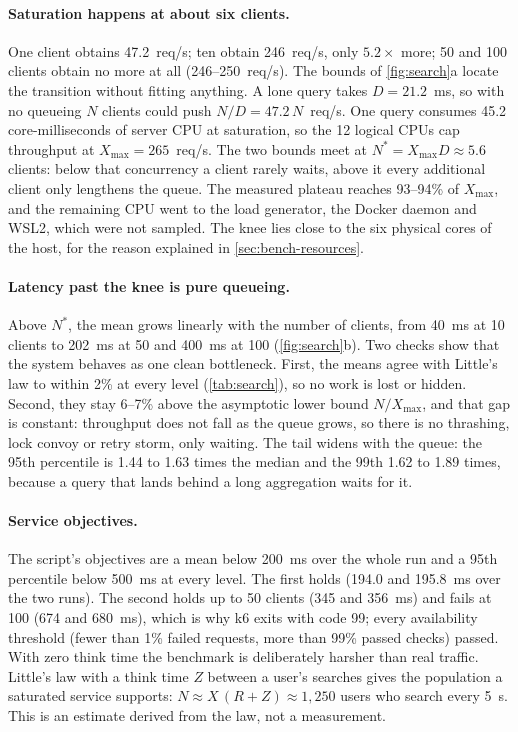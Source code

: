 \documentclass[10pt,a4paper]{article}
\begin{document}
\paragraph{Saturation happens at about six clients.}
One client obtains 47.2~req/s; ten obtain 246~req/s, only $5.2\times$ more;
50 and 100 clients obtain no more at all (246--250~req/s). The bounds of
\cref{fig:search}a locate the transition without fitting anything. A lone query
takes $D = 21.2$~ms, so with no queueing $N$ clients could push $N/D =
47.2\,N$~req/s. One query consumes 45.2 core-milliseconds of server CPU at
saturation, so the 12 logical CPUs cap throughput at $X_{\max} = 265$~req/s. The
two bounds meet at $N^{*} = X_{\max} D \approx 5.6$ clients: below that
concurrency a client rarely waits, above it every additional client only
lengthens the queue. The measured plateau reaches 93--94\% of $X_{\max}$, and the
remaining CPU went to the load generator, the Docker daemon and WSL2, which
were not sampled. The knee lies close to the six physical cores of the host,
for the reason explained in \cref{sec:bench-resources}.

\paragraph{Latency past the knee is pure queueing.}
Above $N^{*}$, the mean grows linearly with the number of clients, from 40~ms at
10 clients to 202~ms at 50 and 400~ms at 100 (\cref{fig:search}b). Two checks
show that the system behaves as one clean bottleneck. First, the means agree with
Little's law to within 2\% at every level (\cref{tab:search}), so no work is
lost or hidden. Second, they stay 6--7\% above the asymptotic lower bound
$N/X_{\max}$, and that gap is constant: throughput does not fall as the queue
grows, so there is no thrashing, lock convoy or retry storm, only waiting. The
tail widens with the queue: the 95th percentile is 1.44 to 1.63 times the
median and the 99th 1.62 to 1.89 times, because a query that lands behind a
long aggregation waits for it.

\paragraph{Service objectives.}
The script's objectives are a mean below 200~ms over the whole run and a 95th
percentile below 500~ms at every level. The first holds (194.0 and 195.8~ms
over the two runs). The second holds up to 50 clients (345 and 356~ms) and
fails at 100 (674 and 680~ms), which is why k6 exits with code 99; every
availability threshold (fewer than 1\% failed requests, more than 99\% passed
checks) passed. With zero think time the benchmark is deliberately harsher
than real traffic. Little's law with a think time $Z$ between a user's
searches gives the population a saturated service supports:
$N \approx X\,(R + Z) \approx 1{,}250$ users who search every 5~s. This is an
estimate derived from the law, not a measurement.
\end{document}
